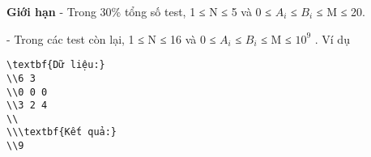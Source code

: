 \textbf{    Giới hạn   }
- Trong 30\% tổng số test, 1 ≤ N ≤ 5 và 0 ≤ $A_{i}$   ≤ $B_{i}$   ≤ M ≤ 20.  

   - Trong các test còn lại, 1 ≤ N ≤ 16 và 0 ≤ $A_{i}$   ≤ $B_{i}$   ≤ M ≤ $10^{9}$   .
Ví dụ
\begin{verbatim}
\textbf{Dữ liệu:}
\\6 3
\\0 0 0
\\3 2 4
\\
\\\textbf{Kết quả:}
\\9\end{verbatim}